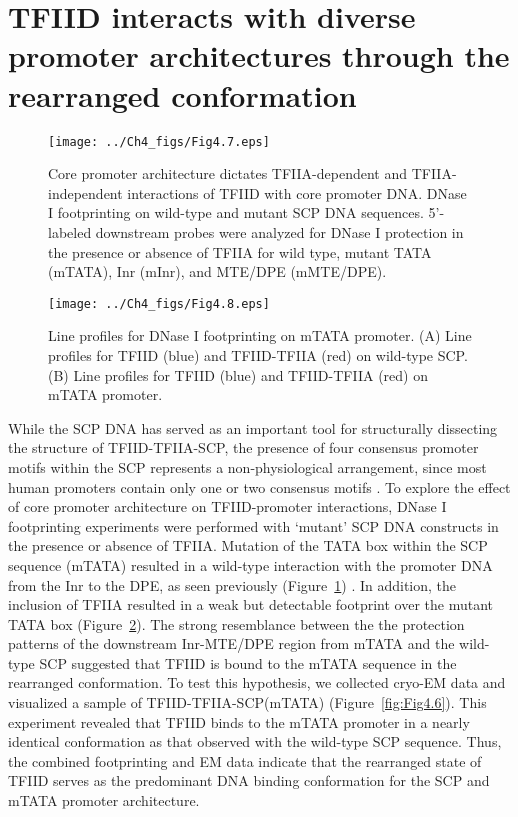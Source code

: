 \section{TFIID interacts with diverse promoter architectures through the rearranged conformation}
\begin{figure}
\centering
\texttt{[image: ../Ch4\_figs/Fig4.7.eps]}
\caption[Core promoter architecture dictates TFIIA-dependent and TFIIA-independent interactions of TFIID with core promoter DNA]{Core promoter architecture dictates TFIIA-dependent and TFIIA-independent interactions of TFIID with core promoter DNA. DNase I footprinting on wild-type and mutant SCP DNA sequences. 5'-labeled downstream probes were analyzed for DNase I protection in the presence or absence of TFIIA for wild type, mutant TATA (mTATA), Inr (mInr), and MTE/DPE (mMTE/DPE).}
\label{fig:Fig4.7}
\end{figure}
\begin{figure}
\centering
\texttt{[image: ../Ch4\_figs/Fig4.8.eps]}
\caption[Line profiles for DNase I footprinting on mTATA promoter]{Line profiles for DNase I footprinting on mTATA promoter.  (A) Line profiles for TFIID (blue) and TFIID-TFIIA (red) on wild-type SCP.  (B) Line profiles for TFIID (blue) and TFIID-TFIIA (red) on mTATA promoter.}
\label{fig:Fig4.8}
\end{figure}
While the SCP DNA has served as an important tool for structurally dissecting the structure of TFIID-TFIIA-SCP, the presence of four consensus promoter motifs within the SCP represents a non-physiological arrangement, since most human promoters contain only one or two consensus motifs \cite{Juven-Gershon_468}. To explore the effect of core promoter architecture on TFIID-promoter interactions, DNase I footprinting experiments were performed with ‘mutant’ SCP DNA constructs in the presence or absence of TFIIA. Mutation of the TATA box within the SCP sequence (mTATA) resulted in a wild-type interaction with the promoter DNA from the Inr to the DPE, as seen previously (Figure~\ref{fig:Fig4.7}) \cite{Juven-Gershon_1249}. In addition, the inclusion of TFIIA resulted in a weak but detectable footprint over the mutant TATA box (Figure~\ref{fig:Fig4.8}). The strong resemblance between the the protection patterns of the downstream Inr-MTE/DPE region from mTATA and the wild-type SCP suggested that TFIID is bound to the mTATA sequence in the rearranged conformation. To test this hypothesis, we collected cryo-EM data and visualized a sample of TFIID-TFIIA-SCP(mTATA) (Figure~\ref{fig:Fig4.6}). This experiment revealed that TFIID binds to the mTATA promoter in a nearly identical conformation as that observed with the wild-type SCP sequence. Thus, the combined footprinting and EM data indicate that the rearranged state of TFIID serves as the predominant DNA binding conformation for the SCP and mTATA promoter architecture.\\
